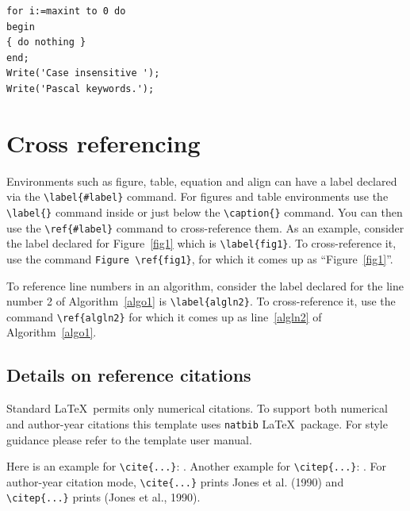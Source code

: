 \documentclass[pdflatex,sn-mathphys-num]{sn-jnl}%
\theoremstyle{thmstyleone}%
\theoremstyle{thmstyletwo}%
\theoremstyle{thmstylethree}%
\begin{document}
\bigskip
\begin{minipage}{\hsize}%
\lstset{frame=single,framexleftmargin=-1pt,framexrightmargin=-17pt,framesep=12pt,linewidth=0.98\textwidth,language=pascal}%
\begin{lstlisting}
for i:=maxint to 0 do
begin
{ do nothing }
end;
Write('Case insensitive ');
Write('Pascal keywords.');
\end{lstlisting}
\end{minipage}

\section{Cross referencing}\label{sec8}

Environments such as figure, table, equation and align can have a label
declared via the \verb+\label{#label}+ command. For figures and table
environments use the \verb+\label{}+ command inside or just
below the \verb+\caption{}+ command. You can then use the
\verb+\ref{#label}+ command to cross-reference them. As an example, consider
the label declared for Figure~\ref{fig1} which is
\verb+\label{fig1}+. To cross-reference it, use the command 
\verb+Figure \ref{fig1}+, for which it comes up as
``Figure~\ref{fig1}''. 

To reference line numbers in an algorithm, consider the label declared for the line number 2 of Algorithm~\ref{algo1} is \verb+\label{algln2}+. To cross-reference it, use the command \verb+\ref{algln2}+ for which it comes up as line~\ref{algln2} of Algorithm~\ref{algo1}.

\subsection{Details on reference citations}\label{subsec7}

Standard \LaTeX\ permits only numerical citations. To support both numerical and author-year citations this template uses \verb+natbib+ \LaTeX\ package. For style guidance please refer to the template user manual.

Here is an example for \verb+\cite{...}+: \cite{bib1}. Another example for \verb+\citep{...}+: \citep{bib2}. For author-year citation mode, \verb+\cite{...}+ prints Jones et al. (1990) and \verb+\citep{...}+ prints (Jones et al., 1990).
\end{document}
